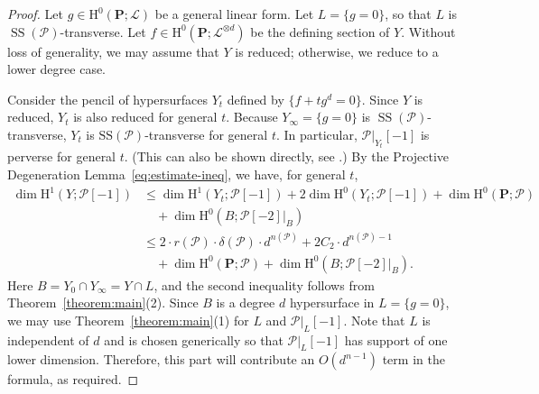 \documentclass[english]{smfart}
\renewcommand{\mathbb}{\mathbf}
\renewcommand{\leq}{\leqslant}
\theoremstyle{remark}
\theoremstyle{plain}
\theoremstyle{definition}
\numberwithin{equation}{remark}
\theoremstyle{void}
\begin{document}
\begin{proof}
Let \(g \in \mathrm{H}^0(\mathbb{P};\mathscr{L})\) be a general linear
form.  Let \(L = \{g = 0\}\), so that \(L\) is
\(\operatorname{SS}(\mathcal{P})\)-transverse.  Let
\(f \in \mathrm{H}^0(\mathbb{P};\mathscr{L}^{\otimes d})\) be the
defining section of \(Y\).  Without loss of generality, we may assume
that \(Y\) is reduced; otherwise, we reduce to a lower degree case.

Consider the pencil of hypersurfaces \(Y_t\) defined by
\(\{f + t g^d = 0\}\).  Since \(Y\) is reduced, \(Y_t\) is also
reduced for general \(t\).  Because \(Y_{\infty} = \{g = 0\}\) is
\(\operatorname{SS}(\mathcal{P})\)-transverse, \(Y_t\) is
\(\mathrm{SS}(\mathcal{P})\)-transverse for general \(t\).
In particular,
\(\mathcal{P}|_{Y_t}[-1]\) is perverse for general \(t\).
(This can also be shown directly, see \cite[Lemma~III~6.3]{kiehl-weissauer_weil-conjectures-perverse-sheaves}.)
By the Projective Degeneration Lemma~\eqref{eq:estimate-ineq}, we
have, for general \(t\),
\begin{align*}
  \dim \mathrm{H}^1(Y; \mathcal{P}[-1])
  &\leq \dim \mathrm{H}^1(Y_t; \mathcal{P}[-1])
    + 2 \dim \mathrm{H}^0(Y_t; \mathcal{P}[-1])
    + \dim \mathrm{H}^0(\mathbb{P}; \mathcal{P})\\
    &\quad + \dim \mathrm{H}^0(B; \mathcal{P}[-2]|_B) \\
  &\leq 2 \cdot r(\mathcal{P}) \cdot \delta(\mathcal{P}) \cdot d^{n(\mathcal{P})}
    + 2C_2 \cdot d^{n(\mathcal{P})-1}\\
  &\quad + \dim \mathrm{H}^{0}(\mathbb{P}; \mathcal{P})
    + \dim \mathrm{H}^0(B; \mathcal{P}[-2]|_B).
\end{align*}
Here \(B = Y_0 \cap Y_{\infty} = Y \cap L\), and the second inequality
follows from Theorem~\ref{theorem:main}(2).  Since \(B\) is a degree \(d\)
hypersurface in \(L = \{g = 0\}\), we may use Theorem~\ref{theorem:main}(1)
for \(L\) and \(\mathcal{P}|_{L}[-1]\).  Note that \(L\) is independent of
\(d\) and is chosen generically so that \(\mathcal{P}|_L[-1]\) has support
of one lower dimension.  Therefore, this part will contribute an
\(O(d^{n-1})\) term in the formula, as required.
\end{proof}
\end{document}
